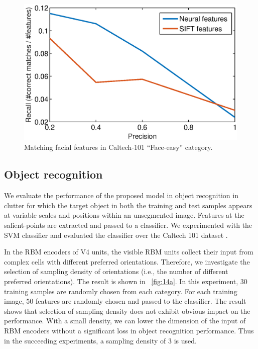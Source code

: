 \documentclass[twocolumn]{article}
\begin{document}
\begin{figure}[!t]
\centerline{\includegraphics[width=0.9\linewidth]{images/fig13.eps}} 
\caption{Matching facial features in Caltech-101 ``Face-easy'' category.}
\label{fig:13}
\end{figure}

\subsection{Object recognition}

We evaluate the performance of the proposed model in object recognition in clutter for which 
the target object in both the training and test samples appears at variable scales and positions within an unsegmented image.
Features at the salient-points are extracted and passed to a classifier.
We experimented with the SVM classifier and evaluated the classifier over the Caltech 101 dataset \cite{fei2007}.

In the RBM encoders of V4 units, the visible RBM units collect their input from complex cells with different preferred orientations.
Therefore, we investigate the selection of sampling density of orientations (i.e., the number of different preferred orientations).
The result is shown in \figurename~\ref{fig:14a}.
In this experiment, 30 training samples are randomly chosen from each category.
For each training image, 50 features are randomly chosen and passed to the classifier.
The result shows that selection of sampling density does not exhibit obvious impact on the performance.
With a small density, we can lower the dimension of the input of RBM encoders without a significant loss in object recognition performance.
Thus in the succeeding experiments, a sampling density of $3$ is used. 
\end{document}
